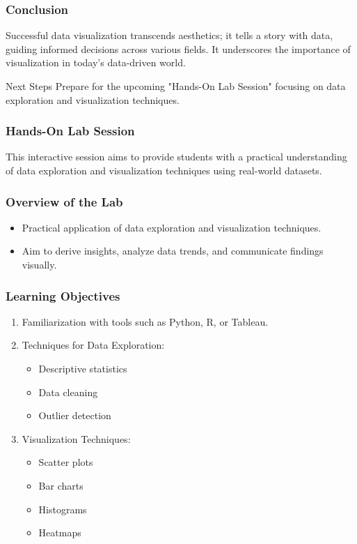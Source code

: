 \documentclass[aspectratio=169]{beamer}
\begin{document}
\begin{frame}[fragile]
    \frametitle{Conclusion}
    Successful data visualization transcends aesthetics; it tells a story with data, guiding informed decisions across various fields. It underscores the importance of visualization in today's data-driven world.
    
    \begin{block}{Next Steps}
        Prepare for the upcoming "Hands-On Lab Session" focusing on data exploration and visualization techniques.
    \end{block}
\end{frame}

\begin{frame}
    \frametitle{Hands-On Lab Session}
    This interactive session aims to provide students with a practical understanding of data exploration and visualization techniques using real-world datasets.
\end{frame}

\begin{frame}
    \frametitle{Overview of the Lab}
    \begin{itemize}
        \item Practical application of data exploration and visualization techniques.
        \item Aim to derive insights, analyze data trends, and communicate findings visually.
    \end{itemize}
\end{frame}

\begin{frame}
    \frametitle{Learning Objectives}
    \begin{enumerate}
        \item Familiarization with tools such as Python, R, or Tableau.
        \item Techniques for Data Exploration:
        \begin{itemize}
            \item Descriptive statistics
            \item Data cleaning
            \item Outlier detection
        \end{itemize}
        \item Visualization Techniques:
        \begin{itemize}
            \item Scatter plots
            \item Bar charts
            \item Histograms
            \item Heatmaps
        \end{itemize}
    \end{enumerate}
\end{frame}
\end{document}
